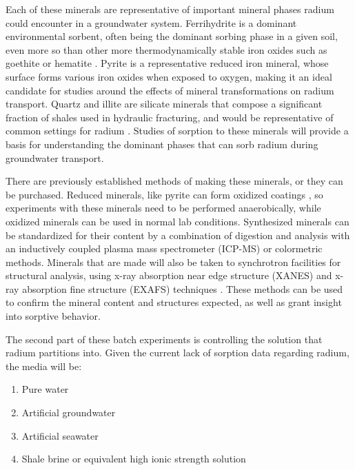\documentclass[twoside,12pt,titlepage]{article}
\begin{document}
\par Each of these minerals are representative of important mineral phases radium could encounter in a groundwater system. Ferrihydrite is a dominant environmental sorbent, often being the dominant sorbing phase in a given soil, even more so than other more thermodynamically stable iron oxides such as goethite or hematite \cite{Michel2007}. Pyrite is a representative reduced iron mineral, whose surface forms various iron oxides when exposed to oxygen, making it an ideal candidate for studies around the effects of mineral transformations on radium transport. Quartz and illite are silicate minerals that compose a significant fraction of shales used in hydraulic fracturing, and would be representative of common settings for radium \cite{Chermak2014}. Studies of sorption to these minerals will provide a basis for understanding the dominant phases that can sorb radium during groundwater transport.
\par There are previously established methods of making these minerals, or they can be purchased. Reduced minerals, like pyrite can form oxidized coatings \cite{Buckley1987}, so experiments with these minerals need to be performed anaerobically, while oxidized minerals can be used in normal lab conditions. Synthesized minerals can be standardized for their content by a combination of digestion and analysis with an inductively coupled plasma mass spectrometer (ICP-MS) or colormetric methods. Minerals that are made will also be taken to synchrotron facilities for structural analysis, using x-ray absorption near edge structure (XANES) and x-ray absorption fine structure (EXAFS) techniques \cite{Fendorf1999}. These methods can be used to confirm the mineral content and structures expected, as well as grant insight into sorptive behavior.
\par The second part of these batch experiments is controlling the solution that radium partitions into. Given the current lack of sorption data regarding radium, the media will be:

\begin{enumerate}[label = \roman*)]
	\item Pure water
	\item Artificial groundwater
	\item Artificial seawater
	\item Shale brine or equivalent high ionic strength solution
\end{enumerate}
\end{document}
